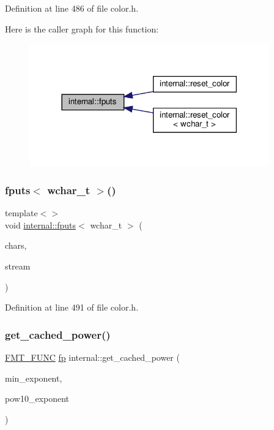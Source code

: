 Definition at line 486 of file color.\+h.

Here is the caller graph for this function\+:
\nopagebreak
\begin{figure}[H]
\begin{center}
\leavevmode
\includegraphics[width=294pt]{namespaceinternal_a5fd63d7d21f506c8c738e5dcecccd35f_icgraph}
\end{center}
\end{figure}
\mbox{\label{namespaceinternal_aa9495944933a6b99e0c7920dde6aecb0}} 
\subsubsection{\texorpdfstring{fputs$<$ wchar\+\_\+t $>$()}{fputs< wchar\_t >()}}
{\footnotesize\ttfamily template$<$$>$ \\
void \hyperlink{namespaceinternal_a5fd63d7d21f506c8c738e5dcecccd35f}{internal\+::fputs}$<$ wchar\+\_\+t $>$ (\begin{DoxyParamCaption}\item[{const wchar\+\_\+t $\ast$}]{chars,  }\item[{F\+I\+LE $\ast$}]{stream }\end{DoxyParamCaption})\hspace{0.3cm}{\ttfamily [inline]}}



Definition at line 491 of file color.\+h.

\mbox{\label{namespaceinternal_aeafc6f6fcfd4e798c6bde994828330e6}} 
\subsubsection{\texorpdfstring{get\+\_\+cached\+\_\+power()}{get\_cached\_power()}}
{\footnotesize\ttfamily \hyperlink{format_8h_a02c8898388e0ae59aab58be14fcd4e05}{F\+M\+T\+\_\+\+F\+U\+NC} \hyperlink{classinternal_1_1fp}{fp} internal\+::get\+\_\+cached\+\_\+power (\begin{DoxyParamCaption}\item[{int}]{min\+\_\+exponent,  }\item[{int \&}]{pow10\+\_\+exponent }\end{DoxyParamCaption})}



